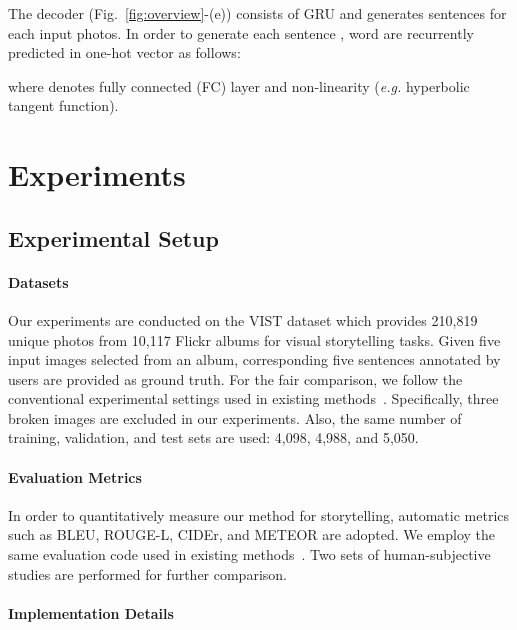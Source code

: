 \documentclass[letterpaper]{article} \usepackage{aaai20}  \usepackage{times}  \usepackage{helvet} \usepackage{courier}  \usepackage[hyphens]{url}  \usepackage{graphicx} \urlstyle{rm} \def\UrlFont{\rm}  \usepackage{graphicx}  \frenchspacing  \setlength{\pdfpagewidth}{8.5in}  \setlength{\pdfpageheight}{11in}
\newcommand{\figref}[1]{Fig.~\ref{#1}}
\newcommand{\eg}{{\it e.g. }}
\begin{document}
The decoder (\figref{fig:overview}-(e)) consists of GRU and generates sentences  for each input photos. In order to generate each sentence , word  are recurrently predicted in one-hot vector  as follows:


where  denotes fully connected (FC) layer and non-linearity (\eg hyperbolic tangent function).


\section{Experiments}

\subsection{Experimental Setup}
\paragraph{Datasets}
\quad

\noindent
Our experiments are conducted on the VIST dataset which provides 210,819 unique photos from 10,117 Flickr albums for visual storytelling tasks. Given five input images selected from an album, corresponding five sentences annotated by users are provided as ground truth. For the fair comparison, we follow the conventional experimental settings used in existing methods~\cite{yu2017hierarchically,wang2018no}. Specifically, three broken images are excluded in our experiments. Also, the same number of training, validation, and test sets are used: 4,098, 4,988, and 5,050.

\paragraph{Evaluation Metrics}
\quad

\noindent
In order to quantitatively measure our method for storytelling, automatic metrics such as BLEU, ROUGE-L, CIDEr, and METEOR are adopted. We employ the same evaluation code used in existing methods~\cite{yu2017hierarchically,wang2018no}. Two sets of human-subjective studies are performed for further comparison.



\paragraph{Implementation Details}
\quad
\end{document}
